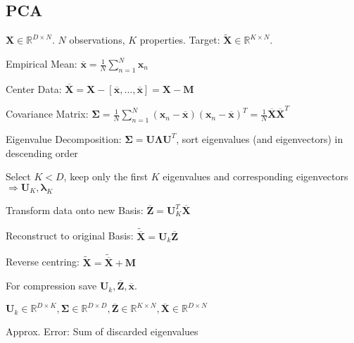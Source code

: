 \documentclass[a4paper, 11pt, landscape]{article}
\begin{document}
\begin{multicols*}{3}

\section{PCA}
$\mathbf{X} \in \mathbb{R}^{D \times N}$. $N$ observations, $K$ properties. Target: $\tilde{\mathbf{X}} \in \mathbb{R}^{K \times N}$.
\begin{compactenum}
	\item Empirical Mean: $\overline{\mathbf{x}} = \frac{1}{N} \sum_{n=1}^N \mathbf{x}_n$
	\item Center Data: $\overline{\mathbf{X}} = \mathbf{X} - [\overline{\mathbf{x}}, \ldots, \overline{\mathbf{x}}] = \mathbf{X} - \mathbf{M}$
	\item Covariance Matrix: $\boldsymbol{\Sigma} = \frac{1}{N	} \sum_{n=1}^N (\mathbf{x}_n - \overline{\mathbf{x}}) (\mathbf{x}_n - \overline{\mathbf{x}})^T = \frac{1}{N} \overline{\mathbf{X}}\overline{\mathbf{X}}^T$
	\item Eigenvalue Decomposition: $\boldsymbol{\Sigma} = \mathbf{U} \boldsymbol{\Lambda} \mathbf{U}^T$, sort eigenvalues (and eigenvectors) in descending order
	\item Select $K < D$, keep only the first $K$ eigenvalues and corresponding eigenvectors $\Rightarrow \mathbf{U}_K, \boldsymbol{\lambda}_K$
	\item Transform data onto new Basis: $\overline{\mathbf{Z}} = \mathbf{U}_K^T \overline{\mathbf{X}}$
	\item Reconstruct to original Basis: $\tilde{\overline{\mathbf{X}}} = \mathbf{U}_k \overline{\mathbf{Z}}$
	\item Reverse centring: $\tilde{\mathbf{X}} = \tilde{\overline{\mathbf{X}}} + \mathbf{M}$
\end{compactenum}

\begin{compactitem}
	\item For compression save $\mathbf{U}_k, \overline{\mathbf{Z}}, \overline{\mathbf{x}}$.
	\item $\mathbf{U}_k \in \mathbb{R}^{D \times K}, \boldsymbol{\Sigma} \in \mathbb{R}^{D \times D}, \overline{\mathbf{Z}} \in \mathbb{R}^{K \times N}, \overline{\mathbf{X}} \in \mathbb{R}^{D \times N}$
\end{compactitem}

\begin{compactdesc}
	\item[Approx. Error:] Sum of discarded eigenvalues
\end{compactdesc}


\end{multicols*}
\end{document}
